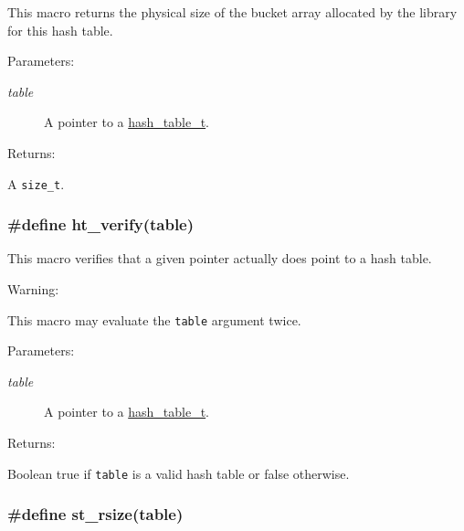This macro returns the physical size of the bucket array allocated by the library for this hash table.\begin{Desc}
\item[Parameters: ]\par
\begin{description}
\item[{\em 
table}]A pointer to a \hyperlink{group__dbprim__hash_a0}{hash\_\-table\_\-t}.\end{description}
\end{Desc}
\begin{Desc}
\item[Returns: ]\par
A {\tt size\_\-t}. \end{Desc}
\hypertarget{group__dbprim__hash_a19}{
\subsubsection[ht\_\-verify]{\setlength{\rightskip}{0pt plus 5cm}\#define ht\_\-verify(table)}}
\label{group__dbprim__hash_a19}


This macro verifies that a given pointer actually does point to a hash table.

\begin{Desc}
\item[Warning: ]\par
This macro may evaluate the {\tt table} argument twice.\end{Desc}
\begin{Desc}
\item[Parameters: ]\par
\begin{description}
\item[{\em 
table}]A pointer to a \hyperlink{group__dbprim__hash_a0}{hash\_\-table\_\-t}.\end{description}
\end{Desc}
\begin{Desc}
\item[Returns: ]\par
Boolean true if {\tt table} is a valid hash table or false otherwise. \end{Desc}
\hypertarget{group__dbprim__hash_a37}{
\subsubsection[st\_\-rsize]{\setlength{\rightskip}{0pt plus 5cm}\#define st\_\-rsize(table)}}
\label{group__dbprim__hash_a37}


